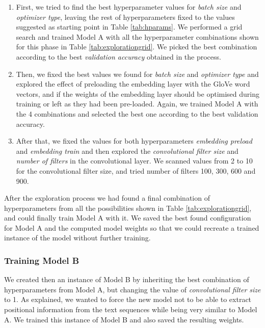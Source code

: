 \documentclass[10pt,journal,compsoc, onecolumn]{IEEEtran}
\begin{document}
\begin{enumerate}
    \item First, we tried to find the best hyperparameter values for \textit{batch size} and \textit{optimizer type}, leaving the rest of hyperparameters fixed to the values suggested as starting point in Table \ref{tab:hparams}. We performed a grid search and trained Model A with all the hyperparameter combinations shown for this phase in Table \ref{tab:explorationgrid}. We picked the best combination according to the best \textit{validation accuracy} obtained in the process. 
    \item Then, we fixed the best values we found for \textit{batch size} and \textit{optimizer type} and explored the effect of preloading the embedding layer with the GloVe word vectors, and if the weights of the embedding layer should be optimised during training or left as they had been pre-loaded. Again, we trained Model A with the 4 combinations and selected the best one according to the best validation accuracy.
    \item After that, we fixed the values for both hyperparameters \textit{embedding preload} and \textit{embedding train} and then explored the \textit{convolutional filter size} and \textit{number of filters} in the convolutional layer. We scanned values from 2 to 10 for the convolutional filter size, and tried number of filters 100, 300, 600 and 900.
\end{enumerate}

After the exploration process we had found a final combination of hyperparameters from all the possibilities shown in Table \ref{tab:explorationgrid}, and could finally train Model A with it. We saved the best found configuration for Model A and the computed model weights so that we could recreate a trained instance of the model without further training.

\subsubsection{Training Model B}

We created then an instance of Model B by inheriting the best combination of  hyperparameters from Model A, but changing the value of \textit{convolutional filter size} to 1. As explained, we wanted to force the new model not to be able to extract positional information from the text sequences while being very similar to Model A. We trained this instance of Model B and also saved the resulting weights.
\end{document}
